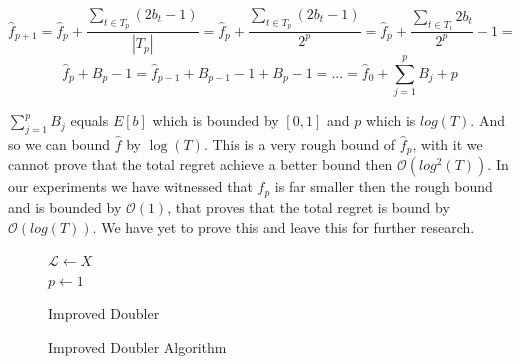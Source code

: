 \documentclass{llncs}
\begin{document}
	$$\hat{f}_{p+1}=\hat{f}_{p} + 
		\frac{\sum\limits_{t\in T_p} (2b_t -1)}{|T_{p}|} = 
		\hat{f}_{p} + 
		\frac{\sum\limits_{t\in T_p} (2b_t -1)}{2^{p}} = 
		\hat{f}_{p} + 
		\frac{\sum\limits_{t\in T_i} 2b_t}{2^{p}}-1 =$$
		$$
		\hat{f}_{p} + B_p -1 =  
		\hat{f}_{p-1} +B_{p-1} -1+ B_p -1 = ... =  
		\hat{f}_{0} + \sum\limits_{j=1}^p B_{j}+p$$
	
	$\sum\limits_{j=1}^p B_{j}$  equals $E[b]$ which is bounded by $[0,1]$ and $p$ which is $log(T)$. And so we can bound $\hat{f}$ by $\log(T)$.
	This is a very rough bound of $\hat{f}_p$, with it we cannot prove that the total regret achieve a better bound then $\mathcal{O}(log^2(T))$.
	In our experiments we have witnessed that $\hat{f}_p$ is far smaller then the rough bound and is bounded by $\mathcal{O}(1)$, that proves that the total regret is bound by $\mathcal{O}(log(T))$.
	We have yet to prove this and leave this for further research.
	
\begin{figure}[h]
	\IncMargin{1em}
		\begin{algorithm}[H]
		\BlankLine
		$\mathcal{L} \leftarrow X$\\
		$p\leftarrow 1$\\
			\caption{Improved Doubler}
		\end{algorithm}
		\caption{Improved Doubler Algorithm}\label{algo_adv_doubler}
	\end{figure}		
	
		
\end{document}
